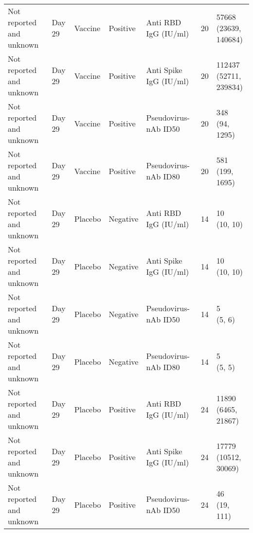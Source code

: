\documentclass[]{book}
\theoremstyle{definition}
\theoremstyle{definition}
\theoremstyle{definition}
\newcommand{\1}{\mathbbm{1}}
\begin{document}
\begin{landscape}
\begin{ThreePartTable}
\begin{longtable}[t]{>{\raggedright\arraybackslash}p{7cm}llllll}
\hspace{1em}Not reported and unknown & Day 29 & Vaccine & Positive & Anti RBD IgG (IU/ml) & 20 & \makecell[l]{57668\\(23639, 140684)}\\
\hspace{1em}Not reported and unknown & Day 29 & Vaccine & Positive & Anti Spike IgG (IU/ml) & 20 & \makecell[l]{112437\\(52711, 239834)}\\
\hspace{1em}Not reported and unknown & Day 29 & Vaccine & Positive & Pseudovirus-nAb ID50 & 20 & \makecell[l]{348\\(94, 1295)}\\
\hspace{1em}Not reported and unknown & Day 29 & Vaccine & Positive & Pseudovirus-nAb ID80 & 20 & \makecell[l]{581\\(199, 1695)}\\
\hspace{1em}Not reported and unknown & Day 29 & Placebo & Negative & Anti RBD IgG (IU/ml) & 14 & \makecell[l]{10\\(10, 10)}\\
\hspace{1em}Not reported and unknown & Day 29 & Placebo & Negative & Anti Spike IgG (IU/ml) & 14 & \makecell[l]{10\\(10, 10)}\\
\hspace{1em}Not reported and unknown & Day 29 & Placebo & Negative & Pseudovirus-nAb ID50 & 14 & \makecell[l]{5\\(5, 6)}\\
\hspace{1em}Not reported and unknown & Day 29 & Placebo & Negative & Pseudovirus-nAb ID80 & 14 & \makecell[l]{5\\(5, 5)}\\
\hspace{1em}Not reported and unknown & Day 29 & Placebo & Positive & Anti RBD IgG (IU/ml) & 24 & \makecell[l]{11890\\(6465, 21867)}\\
\hspace{1em}Not reported and unknown & Day 29 & Placebo & Positive & Anti Spike IgG (IU/ml) & 24 & \makecell[l]{17779\\(10512, 30069)}\\
\hspace{1em}Not reported and unknown & Day 29 & Placebo & Positive & Pseudovirus-nAb ID50 & 24 & \makecell[l]{46\\(19, 111)}\\

\end{longtable}
\end{ThreePartTable}
\end{landscape}
\end{document}
